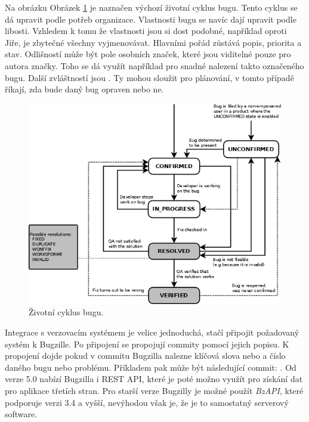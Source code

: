 \documentclass[czech,DP]{thesiskiv}
\begin{document}
Na obrázku Obrázek \ref{pic:bzLifecycle} je naznačen výchozí životní cyklus bugu. Tento cyklus se dá upravit podle potřeb organizace. Vlastnosti bugu se navíc dají upravit podle libosti.  Vzhledem k tomu že vlastnosti jsou si dost podobné, například oproti Jiře, je zbytečné všechny vyjmenovávat. Hlavními pořád zůstává popis, priorita a stav. Odlišností může být pole osobních značek, které jsou viditelné pouze pro autora značky. Toho se dá využít například pro snadné nalezení takto označeného bugu. Další zvláštností jsou . Ty mohou sloužit pro plánování, v tomto případě říkají, zda bude daný bug opraven nebo ne. 
\begin{figure}[!ht]
\begin{center}
	\includegraphics[width=1.0\textwidth]{Pic/bzLifecycle.png}
\end{center}
\label{pic:bzLifecycle}
\caption{Životní cyklus bugu. \citep{bugzillabugtracking}}
\end{figure}

Integrace s verzovacím systémem je velice jednoduchá, stačí připojit požadovaný systém k Bugzille. Po připojení se propojují commity pomocí jejich popisu. K propojení dojde pokud v commitu Bugzilla nalezne klíčová slova  nebo  a číslo daného bugu nebo problému. Příkladem pak může být následující commit: . Od verze 5.0 nabízí Bugzilla i REST API, které je poté možno využít pro získání dat pro aplikace třetích stran. Pro starší verze Bugzilly je možné použít \textit{BzAPI}, které podporuje verzi 3.4 a vyšší, nevýhodou však je, že je to samostatný serverový software.
\end{document}
